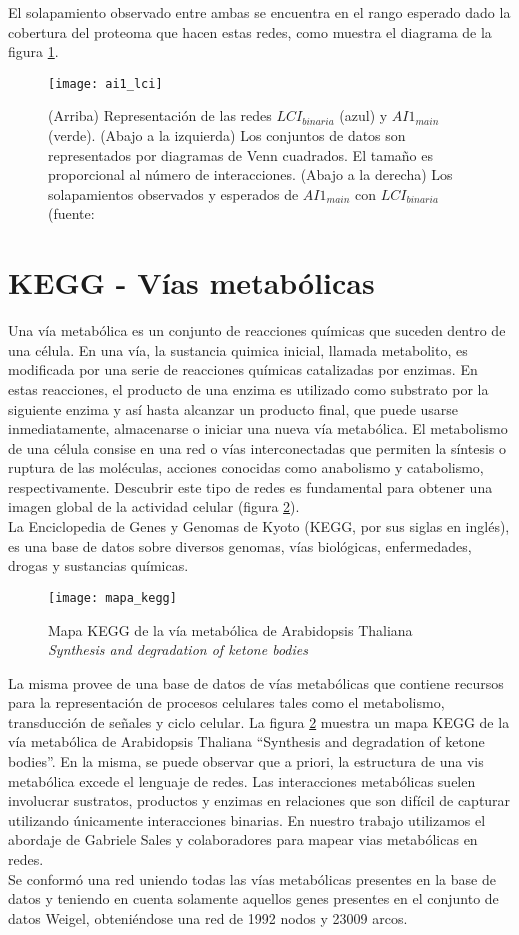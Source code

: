 El solapamiento observado entre ambas se encuentra en el rango esperado dado la cobertura del proteoma que hacen estas redes, como muestra el diagrama de la figura \ref{fig:ai1_lci}.
\begin{figure}[h]
    \centering
    \texttt{[image: ai1\_lci]}
    \caption{(Arriba) Representación de las redes $LCI_{binaria}$ (azul) y $AI1_{main}$ (verde). (Abajo a la izquierda) Los conjuntos de datos son representados por diagramas de Venn cuadrados. El tamaño es proporcional al número de interacciones. (Abajo a la derecha) Los solapamientos observados y esperados de $AI1_{main}$ con $LCI_{binaria}$ (fuente: \cite{Hahn2013}} 
    \label{fig:ai1_lci}
\end{figure}
\section{KEGG - Vías metabólicas}
Una vía metabólica es un conjunto de reacciones químicas que suceden dentro de una célula. En una vía, la sustancia quimica inicial, llamada metabolito, es modificada por una serie de reacciones químicas catalizadas por enzimas. En estas reacciones, el producto de una enzima es utilizado como substrato por la siguiente enzima y así hasta alcanzar un producto final, que puede usarse inmediatamente, almacenarse o iniciar una nueva vía metabólica. El metabolismo de una célula consise en una red o vías interconectadas que permiten la síntesis o ruptura de las moléculas, acciones conocidas como anabolismo y catabolismo, respectivamente. Descubrir este tipo de redes es fundamental para obtener una imagen global de la actividad celular (figura \ref{fig:mapa_kegg}).\\
La Enciclopedia de Genes y Genomas de Kyoto (KEGG, por sus siglas en inglés), es una base de datos sobre diversos genomas, vías biológicas, enfermedades, drogas y sustancias químicas.
\begin{figure}[h]
    \centering
    \texttt{[image: mapa\_kegg]}
    \caption{Mapa KEGG de la vía metabólica de Arabidopsis Thaliana  \textit{Synthesis and degradation of ketone bodies}}
    \label{fig:mapa_kegg}
\end{figure}
La misma provee de una base de datos de vías metabólicas que contiene recursos para la representación de procesos celulares tales como el metabolismo, transducción de señales y ciclo celular. La figura \ref{fig:mapa_kegg} muestra un mapa KEGG de la vía metabólica de Arabidopsis Thaliana ``Synthesis and degradation of ketone bodies''. En la misma, se puede observar que a priori, la estructura de una vis metabólica excede el lenguaje de redes. Las interacciones metabólicas suelen involucrar sustratos, productos y enzimas en relaciones que son difícil de capturar utilizando únicamente interacciones binarias. 
En nuestro trabajo utilizamos el abordaje de Gabriele Sales y colaboradores \cite{Graphite2015} para mapear vias metabólicas en redes.\\
Se conformó una red uniendo todas las vías metabólicas presentes en la base de datos y teniendo en cuenta solamente aquellos genes presentes en el conjunto de datos Weigel, obteniéndose una red de 1992 nodos y 23009 arcos.
\cite{Segal2003, Kanehisa2000}
